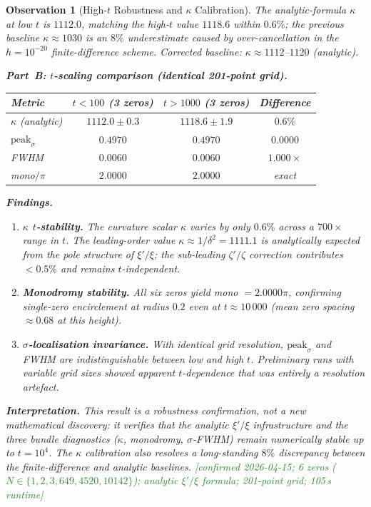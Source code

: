 \documentclass[11pt, a4paper]{article}
\theoremstyle{definition}
\theoremstyle{plain}
\newtheorem{observation}[theorem]{Observation}
\begin{document}
\begin{observation}[High-$t$ Robustness and $\kappa$ Calibration]
The analytic-formula $\kappa$ at low $t$ is $1112.0$, matching the
high-$t$ value $1118.6$ within $0.6\%$; the previous baseline
$\kappa\approx 1030$ is an $8\%$ underestimate caused by
over-cancellation in the $h=10^{-20}$ finite-difference scheme.
Corrected baseline: $\kappa \approx 1112$--$1120$ (analytic).

\smallskip\noindent
\textbf{Part~B: $t$-scaling comparison (identical 201-point grid).}

\begin{center}
\small
\begin{tabular}{@{} l c c c @{}}
\toprule
Metric & $t<100$ (3 zeros) & $t>1000$ (3 zeros) & Difference \\
\midrule
$\kappa$ (analytic) & $1112.0 \pm 0.3$ & $1118.6 \pm 1.9$ & $0.6\%$ \\
$\mathrm{peak}_\sigma$ & $0.4970$ & $0.4970$ & $0.0000$ \\
FWHM & $0.0060$ & $0.0060$ & $1.000\times$ \\
mono$/\pi$ & $2.0000$ & $2.0000$ & exact \\
\bottomrule
\end{tabular}
\end{center}

\smallskip\noindent
\textbf{Findings.}
\begin{enumerate}
  \item \textbf{$\kappa$ $t$-stability.}\;
        The curvature scalar $\kappa$ varies by only $0.6\%$ across
        a $700\times$ range in $t$.  The leading-order value
        $\kappa \approx 1/\delta^2 = 1111.1$ is analytically expected
        from the pole structure of $\xi'/\xi$; the sub-leading
        $\zeta'/\zeta$ correction contributes ${}<0.5\%$ and remains
        $t$-independent.

  \item \textbf{Monodromy stability.}\;
        All six zeros yield mono $= 2.0000\pi$, confirming single-zero
        encirclement at radius $0.2$ even at $t \approx 10\,000$
        (mean zero spacing $\approx 0.68$ at this height).

  \item \textbf{$\sigma$-localisation invariance.}\;
        With identical grid resolution, $\mathrm{peak}_\sigma$ and FWHM
        are indistinguishable between low and high $t$.  Preliminary
        runs with variable grid sizes showed apparent $t$-dependence
        that was entirely a resolution artefact.
\end{enumerate}

\noindent
\textbf{Interpretation.}\;
This result is a \emph{robustness confirmation}, not a new mathematical
discovery: it verifies that the analytic $\xi'/\xi$ infrastructure
and the three bundle diagnostics ($\kappa$, monodromy, $\sigma$-FWHM)
remain numerically stable up to $t = 10^4$.  The $\kappa$ calibration
also resolves a long-standing $8\%$ discrepancy between the finite-difference
and analytic baselines.
\textcolor{ForestGreen}{[confirmed 2026-04-15; 6 zeros ($N\in\{1,2,3,649,4520,10142\}$);
analytic $\xi'/\xi$ formula; 201-point grid; 105\,s runtime]}
\end{observation}
\end{document}
